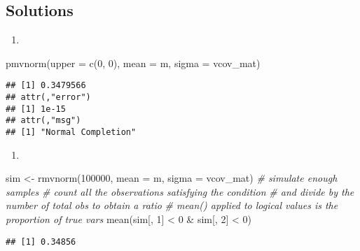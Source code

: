 \documentclass[
  oneside]{book}
\newenvironment{Shaded}{\begin{snugshade}}{\end{snugshade}}
\newcommand{\AttributeTok}[1]{\textcolor[rgb]{0.77,0.63,0.00}{#1}}
\newcommand{\CommentTok}[1]{\textcolor[rgb]{0.56,0.35,0.01}{\textit{#1}}}
\newcommand{\DecValTok}[1]{\textcolor[rgb]{0.00,0.00,0.81}{#1}}
\newcommand{\FunctionTok}[1]{\textcolor[rgb]{0.00,0.00,0.00}{#1}}
\newcommand{\NormalTok}[1]{#1}
\newcommand{\OtherTok}[1]{\textcolor[rgb]{0.56,0.35,0.01}{#1}}
\newcommand{\SpecialCharTok}[1]{\textcolor[rgb]{0.00,0.00,0.00}{#1}}
\providecommand{\tightlist}{%
  \setlength{\itemsep}{0pt}\setlength{\parskip}{0pt}}
\begin{document}
\hypertarget{solutions}{%
\subsection{Solutions}\label{solutions}}

\begin{enumerate}
\def\labelenumi{\alph{enumi}.}
\tightlist
\item
\end{enumerate}

\begin{Shaded}
\begin{Highlighting}[]
\FunctionTok{pmvnorm}\NormalTok{(}\AttributeTok{upper =} \FunctionTok{c}\NormalTok{(}\DecValTok{0}\NormalTok{, }\DecValTok{0}\NormalTok{), }\AttributeTok{mean =}\NormalTok{ m, }\AttributeTok{sigma =}\NormalTok{ vcov\_mat)}
\end{Highlighting}
\end{Shaded}

\begin{verbatim}
## [1] 0.3479566
## attr(,"error")
## [1] 1e-15
## attr(,"msg")
## [1] "Normal Completion"
\end{verbatim}

\begin{enumerate}
\def\labelenumi{\alph{enumi}.}
\setcounter{enumi}{1}
\tightlist
\item
\end{enumerate}

\begin{Shaded}
\begin{Highlighting}[]
\NormalTok{sim }\OtherTok{\textless{}{-}} \FunctionTok{rmvnorm}\NormalTok{(}\DecValTok{100000}\NormalTok{, }\AttributeTok{mean =}\NormalTok{ m, }\AttributeTok{sigma =}\NormalTok{ vcov\_mat) }\CommentTok{\# simulate enough samples}
\CommentTok{\# count all the observations satisfying the condition}
\CommentTok{\# and divide by the number of total obs to obtain a ratio}
\CommentTok{\# mean() applied to logical values is the proportion of true vars}
\FunctionTok{mean}\NormalTok{(sim[, }\DecValTok{1}\NormalTok{] }\SpecialCharTok{\textless{}} \DecValTok{0} \SpecialCharTok{\&}\NormalTok{ sim[, }\DecValTok{2}\NormalTok{] }\SpecialCharTok{\textless{}} \DecValTok{0}\NormalTok{)}
\end{Highlighting}
\end{Shaded}

\begin{verbatim}
## [1] 0.34856
\end{verbatim}
\end{document}
